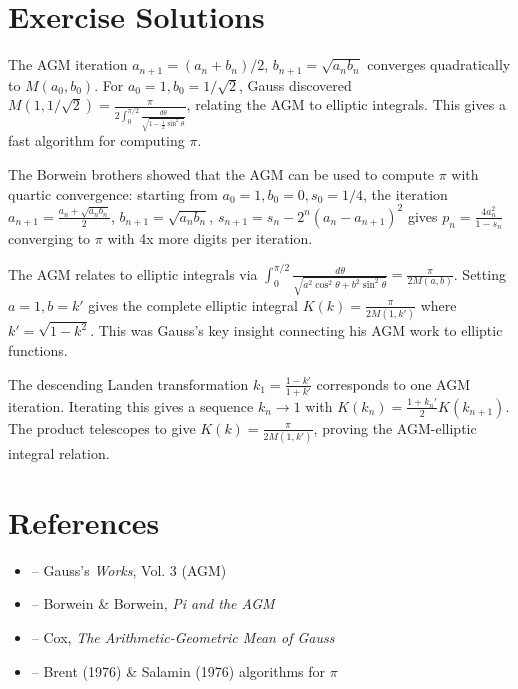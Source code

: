 \section{Exercise Solutions}

\begin{solution}
The AGM iteration $a_{n+1} = (a_n+b_n)/2$, $b_{n+1} = \sqrt{a_n b_n}$ converges quadratically to $M(a_0, b_0)$. For $a_0 = 1, b_0 = 1/\sqrt{2}$, Gauss discovered $M(1, 1/\sqrt{2}) = \frac{\pi}{2\int_0^{\pi/2}\frac{d\theta}{\sqrt{1-\frac{1}{2}\sin^2\theta}}}$, relating the AGM to elliptic integrals. This gives a fast algorithm for computing $\pi$.
\end{solution}

\begin{solution}
The Borwein brothers showed that the AGM can be used to compute $\pi$ with quartic convergence: starting from $a_0 = 1, b_0 = 0, s_0 = 1/4$, the iteration $a_{n+1} = \frac{a_n+\sqrt{a_n b_n}}{2}$, $b_{n+1} = \sqrt{a_n b_n}$, $s_{n+1} = s_n - 2^n(a_n - a_{n+1})^2$ gives $p_n = \frac{4a_n^2}{1-s_n}$ converging to $\pi$ with 4x more digits per iteration.
\end{solution}

\begin{solution}
The AGM relates to elliptic integrals via $\int_0^{\pi/2}\frac{d\theta}{\sqrt{a^2\cos^2\theta + b^2\sin^2\theta}} = \frac{\pi}{2M(a,b)}$. Setting $a = 1, b = k'$ gives the complete elliptic integral $K(k) = \frac{\pi}{2M(1,k')}$ where $k' = \sqrt{1-k^2}$. This was Gauss's key insight connecting his AGM work to elliptic functions.
\end{solution}

\begin{solution}
The descending Landen transformation $k_1 = \frac{1-k'}{1+k'}$ corresponds to one AGM iteration. Iterating this gives a sequence $k_n \to 1$ with $K(k_n) = \frac{1+k_n'}{2}K(k_{n+1})$. The product telescopes to give $K(k) = \frac{\pi}{2M(1,k')}$, proving the AGM-elliptic integral relation.
\end{solution}


\section{References}

\begin{itemize}
    \item \cite{gauss-works} -- Gauss's \textit{Works}, Vol. 3 (AGM)
    \item \cite{borwein-borwein} -- Borwein \& Borwein, \textit{Pi and the AGM}
    \item \cite{cox-agm} -- Cox, \textit{The Arithmetic-Geometric Mean of Gauss}
    \item \cite{brent-salamin,salamin-1976} -- Brent (1976) \& Salamin (1976) algorithms for $\pi$
\end{itemize}